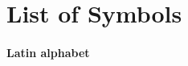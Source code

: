 














\newcommand\mytab{\tab \hspace{-5cm}}
\newcommand\mynewline{ \par \vspace{-\parskip}}



\chapter*{List of Symbols} 
\subsubsection*{Latin alphabet}

